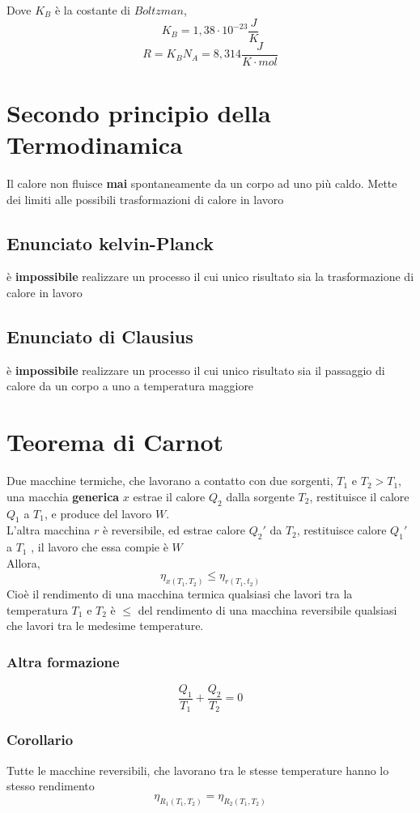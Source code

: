 \documentclass[a4paper]{report}
\begin{document}
  Dove $K_B$ è la costante di $Boltzman$,
  \[ K_B = 1,38 \cdot 10^{-23} \frac{J}{K}\]
  \[ R = K_B N_A = 8,314 \frac{J}{K \cdot mol} \]

  \section{Secondo principio della Termodinamica}
  Il calore non fluisce \textbf{mai} spontaneamente da un corpo ad uno più caldo.
  Mette dei limiti alle possibili trasformazioni di calore in lavoro
  \subsection{Enunciato kelvin-Planck}
  è \textbf{impossibile} realizzare un processo il cui unico risultato sia la trasformazione di calore in lavoro
  \subsection{Enunciato di Clausius}
  è \textbf{impossibile} realizzare un processo il cui unico risultato sia il passaggio di calore da un corpo a uno a temperatura maggiore

  \section{Teorema di Carnot}
  Due macchine termiche, che lavorano a contatto con due sorgenti, $T_1$ e $T_2 > T_1$, una macchia \textbf{generica} $x$ estrae il calore $Q_2$ dalla sorgente $T_2$, restituisce il calore $Q_1$ a $T_1$, e produce del lavoro $W$. \\
  L'altra macchina $r$ è reversibile, ed estrae calore $Q_2'$ da $T_2$, restituisce calore $Q_1'$ a $T_1$ , il lavoro che essa compie è $W$\\
  Allora,
  \[ \eta_{x(T_1, T_2)}  \leq \eta_{r(T_1, t_2)} \]
  Cioè il rendimento di una macchina termica qualsiasi che lavori tra la temperatura $T_1$ e $T_2$ è $\leq$ del rendimento di una macchina reversibile qualsiasi che lavori tra le medesime temperature.
  \subsubsection{Altra formazione}
  \[ \frac{Q_1}{T_1} + \frac{Q_2}{T_2} = 0 \]

  \subsubsection{Corollario}
  Tutte le macchine reversibili, che lavorano tra le stesse temperature hanno lo stesso rendimento
  \[ \eta_{R_1(T_1, T_2)} = \eta_{R_2(T_1, T_2)} \]
\end{document}
